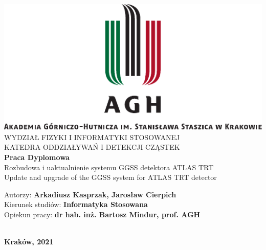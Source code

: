 \documentclass[11pt]{aghdpl}
\begin{document}

\thispagestyle{empty}
\begin{center}
\includegraphics[scale=1.4]{static/agh_nzw_s_pl_1w_wbr_cmyk.pdf} \\[0.2cm]

WYDZIAŁ FIZYKI I INFORMATYKI STOSOWANEJ \\[0.2cm]
KATEDRA ODDZIAŁYWAŃ I DETEKCJI CZĄSTEK \\[1.2cm]
\textbf{\huge Praca Dyplomowa} \\[1.2cm]



{\LARGE Rozbudowa i uaktualnienie systemu GGSS detektora ATLAS TRT}\\[0.8cm]
{\LARGE Update and upgrade of the GGSS system for ATLAS TRT detector}\\

\vfill

\begin{minipage}{\textwidth}
\begin{flushleft}
{
    \large 
    Autorzy: \hfill \textbf{Arkadiusz Kasprzak, Jarosław Cierpich} \\[0.1cm]
    Kierunek studiów: \hfill \textbf{Informatyka Stosowana} \\[0.1cm]
    Opiekun pracy: \hfill \textbf{dr hab. inż. Bartosz Mindur, prof. AGH} \\[0.1cm]
}
\end{flushleft}
\end{minipage} \\[2cm]


{\large \bf \textsf{Kraków, 2021}}
\end{center}
\end{document}
